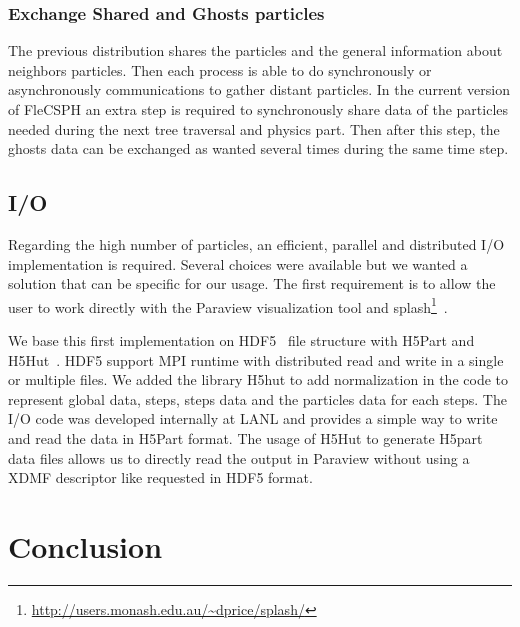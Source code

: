 \subsubsection{Exchange Shared and Ghosts particles}

The previous distribution shares the particles and the general information about neighbors particles. 
Then each process is able to do synchronously or asynchronously communications to gather distant particles. 
In the current version of FleCSPH an extra step is required to synchronously share data of the particles needed during the next tree traversal and physics part. 
Then after this step, the ghosts data can be exchanged as wanted several times during the same time step. 

\subsection{I/O}
Regarding the high number of particles, an efficient, parallel and distributed I/O implementation is required. 
Several choices were available but we wanted a solution that can be specific for our usage. 
The first requirement is to allow the user to work directly with the Paraview visualization tool and splash\footnote{\url{http://users.monash.edu.au/~dprice/splash/}}~\cite{price2007splash}.

We base this first implementation on HDF5~\cite{folk1999hdf5} file structure with H5Part and H5Hut~\cite{howison2010h5hut}. 
HDF5 support MPI runtime with distributed read and write in a single or multiple files. 
We added the library H5hut to add normalization in the code to represent global data, steps, steps data and the particles data for each steps.
The I/O code was developed internally at LANL and provides a simple way to write and read the data in H5Part format. 
The usage of H5Hut to generate H5part data files allows us to directly read the output in Paraview without using a XDMF descriptor like requested in HDF5 format.


\section{Conclusion}
